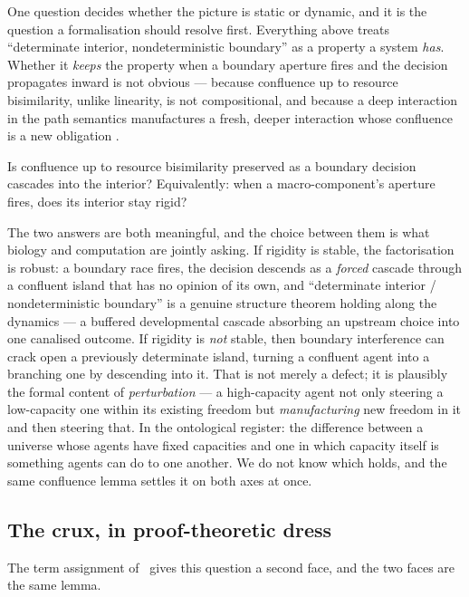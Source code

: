 One question decides whether the picture is static or dynamic, and it is the question a
formalisation should resolve first. Everything above treats ``determinate interior,
nondeterministic boundary'' as a property a system \emph{has}. Whether it \emph{keeps}
the property when a boundary aperture fires and the decision propagates inward is not
obvious --- because confluence up to resource bisimilarity, unlike linearity, is not
compositional, and because a deep interaction in the path semantics manufactures a fresh,
deeper interaction whose confluence is a new obligation \cite{paths}.

\begin{question}\label{ndo:q:crux}
Is confluence up to resource bisimilarity preserved as a boundary decision cascades into
the interior? Equivalently: when a macro-component's aperture fires, does its interior
stay rigid?
\end{question}

\noindent
The two answers are both meaningful, and the choice between them is what biology and
computation are jointly asking. If rigidity is stable, the factorisation is robust: a
boundary race fires, the decision descends as a \emph{forced} cascade through a confluent
island that has no opinion of its own, and ``determinate interior / nondeterministic
boundary'' is a genuine structure theorem holding along the dynamics --- a buffered
developmental cascade absorbing an upstream choice into one canalised outcome. If rigidity
is \emph{not} stable, then boundary interference can crack open a previously determinate
island, turning a confluent agent into a branching one by descending into it. That is not
merely a defect;
it is plausibly the formal content of \emph{perturbation} --- a high-capacity agent not
only steering a low-capacity one within its existing freedom but \emph{manufacturing} new
freedom in it and then steering that. In the ontological register: the difference between a
universe whose agents have fixed capacities and one in which capacity itself is something
agents can do to one another. We do not know which holds, and the same confluence lemma
settles it on both axes at once.


\subsection{The crux, in proof-theoretic dress}

The term assignment of \chChs\ gives this question a second face, and the two faces
are the same lemma.

